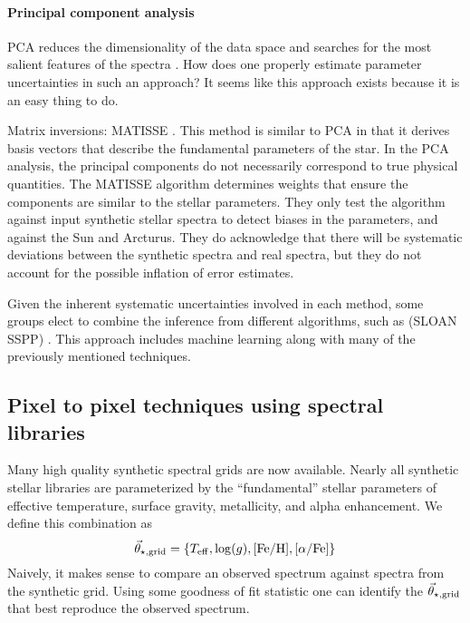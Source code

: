 \documentclass[preprint]{aastex} %
\newcommand{\vt}{\vec{\theta}}
\newcommand{\vg}{\vt_{\star, {\rm grid}}}
\newcommand{\Z}{[{\rm Fe}/{\rm H}]}
\newcommand{\A}{[\alpha/{\rm Fe}]}
\begin{document}
\paragraph{Principal component analysis} PCA reduces the dimensionality of the data space and searches for the most salient features of the spectra \citep{ptb14}. How does one properly estimate parameter uncertainties in such an approach? It seems like this approach exists because it is an easy thing to do.

Matrix inversions: MATISSE \citep{rbd06}. This method is similar to PCA in that it derives basis vectors that describe the fundamental parameters of the star. In the PCA analysis, the principal components do not necessarily correspond to true physical quantities. The MATISSE algorithm determines weights that ensure the components are similar to the stellar parameters. They only test the algorithm against input synthetic stellar spectra to detect biases in the parameters, and against the Sun and Arcturus. They do acknowledge that there will be systematic deviations between the synthetic spectra and real spectra, but they do not account for the possible inflation of error estimates.

Given the inherent systematic uncertainties involved in each method, some groups elect to combine the inference from different algorithms, such as (SLOAN SSPP) \citep{lbs+08}. This approach includes machine learning along with many of the previously mentioned techniques.

\subsection{Pixel to pixel techniques using spectral libraries}
Many high quality synthetic spectral grids are now available. Nearly all synthetic stellar libraries are parameterized by the ``fundamental'' stellar parameters of effective temperature, surface gravity, metallicity, and alpha enhancement. We define this combination as 
\begin{equation}
  \vg = \{T_{\rm eff}, \log(g), \Z, \A \}
\end{equation}
Naively, it makes sense to compare an observed spectrum against spectra from the synthetic grid. Using some goodness of fit statistic one can identify the $\vg$ that best reproduce the observed spectrum.  
\end{document}
